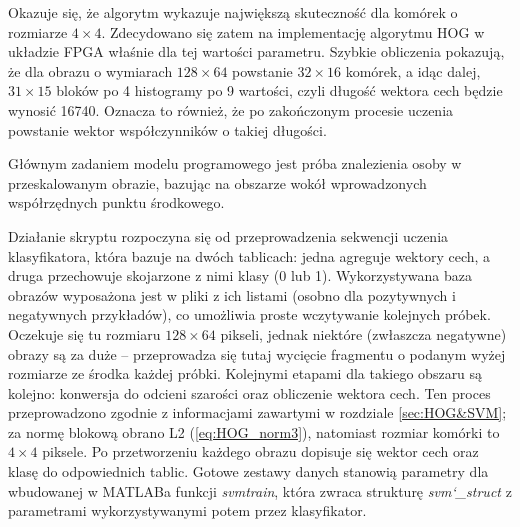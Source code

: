  Okazuje się, że algorytm wykazuje największą skuteczność dla komórek o rozmiarze $4\times 4$. 
 Zdecydowano się zatem na implementację algorytmu HOG w układzie FPGA właśnie dla tej wartości parametru. 
 Szybkie obliczenia pokazują, że dla obrazu o wymiarach $128\times 64$ powstanie $32\times 16$ komórek, a idąc dalej, $31\times 15$ bloków po 4 histogramy po 9 wartości, czyli długość wektora cech będzie wynosić 16740. 
 Oznacza to również, że po zakończonym procesie uczenia powstanie wektor współczynników o takiej długości. %
 

Głównym zadaniem modelu programowego jest próba znalezienia osoby w przeskalowanym obrazie, bazując na obszarze wokół wprowadzonych współrzędnych punktu środkowego. %


Działanie skryptu rozpoczyna się od przeprowadzenia sekwencji uczenia klasyfikatora, która bazuje na dwóch tablicach: jedna agreguje wektory cech, a druga przechowuje skojarzone z nimi klasy (0 lub 1). 
Wykorzystywana baza obrazów wyposażona jest w pliki z ich listami (osobno dla pozytywnych i negatywnych przykładów), co umożliwia proste wczytywanie kolejnych próbek. 
Oczekuje się tu rozmiaru $128\times 64$ pikseli, jednak niektóre (zwłaszcza negatywne) obrazy są za duże -- przeprowadza się tutaj wycięcie fragmentu o podanym wyżej rozmiarze ze środka każdej próbki. 
Kolejnymi etapami dla takiego obszaru są kolejno: konwersja do odcieni szarości oraz obliczenie wektora cech. 
Ten proces przeprowadzono zgodnie z informacjami zawartymi w rozdziale \ref{sec:HOG&SVM}; za normę blokową obrano L2 (\eqref{eq:HOG_norm3}), natomiast rozmiar komórki to $4\times 4$ piksele. 
Po przetworzeniu każdego obrazu dopisuje się wektor cech oraz klasę do odpowiednich tablic. %
Gotowe zestawy danych stanowią parametry dla wbudowanej w MATLABa funkcji \textit{svmtrain}, która zwraca strukturę \textit{svm\char`_struct} z parametrami wykorzystywanymi potem przez klasyfikator.

